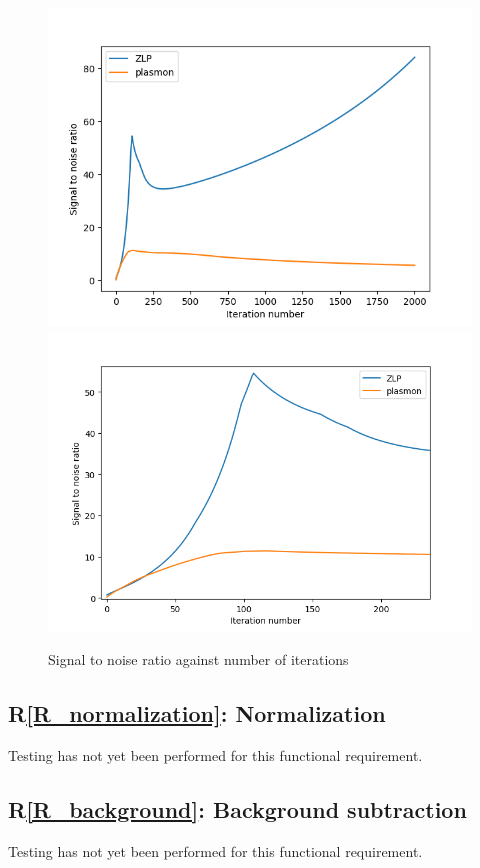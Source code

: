 \documentclass[12pt, titlepage]{article}
\newcommand{\rref}[1]{R\ref{#1}}
\begin{document}
\begin{figure}[h]
    \includegraphics[scale=0.4]{snr-SimNoise3exp_PSF.png}
    \includegraphics[scale=0.4]{snr-SimNoise3exp_PSF-2.png}
    \caption{Signal to noise ratio against number of iterations
        \label{fig:SNR}}
\end{figure}

\subsection{\rref{R_normalization}: Normalization}
Testing has not yet been performed for this functional requirement.

\subsection{\rref{R_background}: Background subtraction}
Testing has not yet been performed for this functional requirement.
\end{document}
